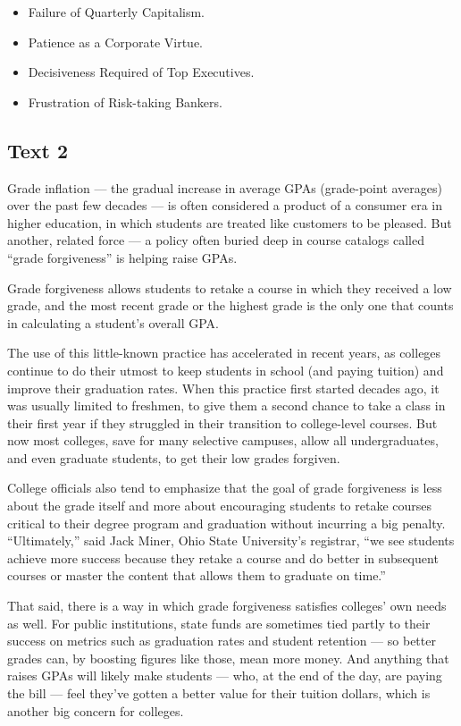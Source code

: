 \documentclass[UTF8,11pt]{ctexart}
\begin{document}
\begin{itemize}[leftmargin=2em,itemsep=.2em,topsep=.4em]\item[A.] Failure of Quarterly Capitalism.
\item[B.] Patience as a Corporate Virtue.
\item[C.] Decisiveness Required of Top Executives.
\item[D.] Frustration of Risk-taking Bankers.
\end{itemize}

\subsection*{\textbf{Text 2}}


Grade inflation — the gradual increase in average GPAs (grade-point averages) over the past few decades — is often considered a product of a consumer era in higher education, in which students are treated like customers to be pleased. But another, related force — a policy often buried deep in course catalogs called “grade forgiveness” is helping raise GPAs.


Grade forgiveness allows students to retake a course in which they received a low grade, and the most recent grade or the highest grade is the only one that counts in calculating a student’s overall GPA.


The use of this little-known practice has accelerated in recent years, as colleges continue to do their utmost to keep students in school (and paying tuition) and improve their graduation rates. When this practice first started decades ago, it was usually limited to freshmen, to give them a second chance to take a class in their first year if they struggled in their transition to college-level courses. But now most colleges, save for many selective campuses, allow all undergraduates, and even graduate students, to get their low grades forgiven.


College officials also tend to emphasize that the goal of grade forgiveness is less about the grade itself and more about encouraging students to retake courses critical to their degree program and graduation without incurring a big penalty. “Ultimately,” said Jack Miner, Ohio State University’s registrar, “we see students achieve more success because they retake a course and do better in subsequent courses or master the content that allows them to graduate on time.”


That said, there is a way in which grade forgiveness satisfies colleges’ own needs as well. For public institutions, state funds are sometimes tied partly to their success on metrics such as graduation rates and student retention — so better grades can, by boosting figures like those, mean more money. And anything that raises GPAs will likely make students — who, at the end of the day, are paying the bill — feel they’ve gotten a better value for their tuition dollars, which is another big concern for colleges.
\end{document}
